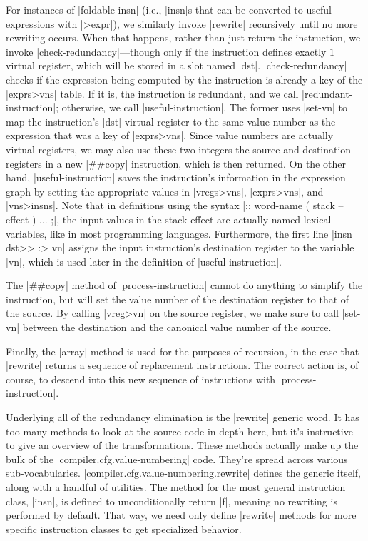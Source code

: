 For instances of \factor|foldable-insn| (i.e., \factor|insn|s that can be
converted to useful expressions with \factor|>expr|), we similarly invoke
\factor|rewrite| recursively until no more rewriting occurs.  When that
happens, rather than just return the instruction, we invoke
\factor|check-redundancy|---though only if the instruction defines exactly $1$
virtual register, which will be stored in a slot named \factor|dst|.
\factor|check-redundancy| checks if the expression being computed by the
instruction is already a key of the \factor|exprs>vns| table.  If it is, the
instruction is redundant, and we call \factor|redundant-instruction|;
otherwise, we call \factor|useful-instruction|.  The former uses
\factor|set-vn| to map the instruction's \factor|dst| virtual register to the
same value number as the expression that was a key of \factor|exprs>vns|.
Since value numbers are actually virtual registers, we may also use these two
integers the source and destination registers in a new \factor|##copy|
instruction, which is then returned.  On the other hand,
\factor|useful-instruction| saves the instruction's information in the
expression graph by setting the appropriate values in \factor|vregs>vns|,
\factor|exprs>vns|, and \factor|vns>insns|.  Note that in definitions using the
syntax
%
\factor|:: word-name ( stack -- effect ) ... ;|,
%
the input values in the stack effect are actually named lexical variables, like
in most programming languages.  Furthermore, the
first line
%
\factor|insn dst>> :> vn|
%
assigns the input instruction's destination register to the variable
\factor|vn|, which is used later in the definition of
\factor|useful-instruction|.

The \factor|##copy| method of \factor|process-instruction| cannot do anything
to simplify the instruction, but will set the value number of the destination
register to that of the source.  By calling \factor|vreg>vn| on the source
register, we make sure to call \factor|set-vn| between the destination and the
canonical value number of the source.

Finally, the \factor|array| method is used for the purposes of recursion, in
the case that \factor|rewrite| returns a sequence of replacement instructions.
The correct action is, of course, to descend into this new sequence of
instructions with \factor|process-instruction|.

Underlying all of the redundancy elimination is the \factor|rewrite| generic
word.  It has too many methods to look at the source code in-depth here, but
it's instructive to give an overview of the transformations.  These methods
actually make up the bulk of the \factor|compiler.cfg.value-numbering| code.
They're spread across various sub-vocabularies.
\factor|compiler.cfg.value-numbering.rewrite| defines the generic itself, along
with a handful of utilities.  The method for the most general instruction
class, \factor|insn|, is defined to unconditionally return \factor|f|, meaning
no rewriting is performed by default.  That way, we need only define
\factor|rewrite| methods for more specific instruction classes to get
specialized behavior.

